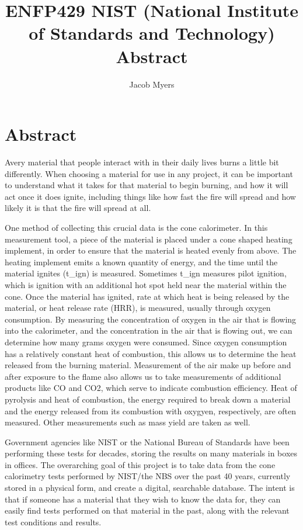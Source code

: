 \documentclass{abstract}
\title{ENFP429 NIST (National Institute of Standards and Technology) Abstract}
\author{Jacob Myers}
\begin{document}
\maketitle
\section{Abstract}
Avery material that people interact with in their daily lives burns a little bit differently. When choosing a material for use in any project, it can be important to understand what it takes for that material to begin burning, and how it will act once it does ignite, including things like how fast the fire will spread and how likely it is that the fire will spread at all. 

One method of collecting this crucial data is the cone calorimeter. In this measurement tool, a piece of the material is placed under a cone shaped heating implement, in order to ensure that the material is heated evenly from above. The heating implement emits a known quantity of energy, and the time until the material ignites (t\_ign) is measured. Sometimes t\_ign measures pilot ignition, which is ignition with an additional hot spot held near the material within the cone. Once the material has ignited, rate at which heat is being released by the material, or heat release rate (HRR), is measured, usually through oxygen consumption. By measuring the concentration of oxygen in the air that is flowing into the calorimeter, and the concentration in the air that is flowing out, we can determine how many grams oxygen were consumed. Since oxygen consumption has a relatively constant heat of combustion, this allows us to determine the heat released from the burning material. Measurement of the air make up before and after exposure to the flame also allows us to take measurements of additional products like CO and CO2, which serve to indicate combustion efficiency. Heat of pyrolysis and heat of combustion, the energy required to break down a material and the energy released from its combustion with oxygyen, respectively, are often measured. Other measurements such as mass yield are taken as well.

Government agencies like NIST or the National Bureau of Standards have been performing these tests for decades, storing the results on many materials in boxes in offices. The overarching goal of this project is to take data from the cone calorimetry tests performed by NIST/the NBS over the past 40 years, currently stored in a physical form, and create a digital, searchable database. The intent is that if someone has a material that they wish to know the data for, they can easily find tests performed on that material in the past, along with the relevant test conditions and results.
\end{document}
